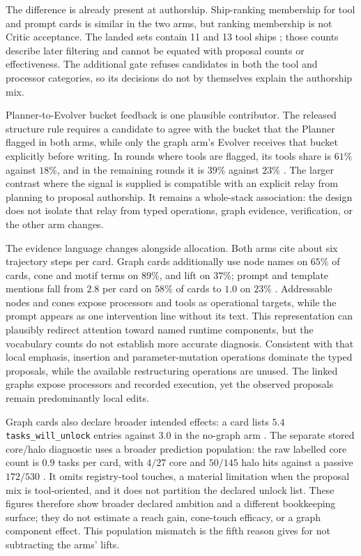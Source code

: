 The difference is already present at authorship. Ship-ranking membership for
tool and prompt cards is similar in the two arms, but ranking membership is
not Critic acceptance. The landed sets contain 11 and 13 tool ships ;
those counts describe later filtering and cannot be equated with proposal
counts or effectiveness. The additional gate refuses candidates in both the
tool and processor categories, so its decisions do not by themselves explain
the authorship mix.

Planner-to-Evolver bucket feedback is one plausible contributor. The
released structure rule requires a candidate to agree with the bucket that
the Planner flagged in both arms, while only the graph arm's Evolver receives
that bucket explicitly before writing. In rounds where tools are flagged, its tools share is
$61\%$ against $18\%$, and in the remaining rounds it is $39\%$ against
$23\%$ . The larger contrast where the signal is supplied is
compatible with an explicit relay from planning to proposal authorship. It
remains a whole-stack association: the design does not isolate that relay
from typed operations, graph evidence, verification, or the other arm
changes.

The evidence language changes alongside allocation. Both arms cite about six
trajectory steps per card. Graph cards additionally use node names on
$65\%$ of cards, cone and motif terms on $89\%$, and lift on $37\%$;
prompt and template mentions fall from $2.8$ per card on $58\%$ of cards to
$1.0$ on $23\%$ . Addressable nodes and cones expose processors and
tools as operational targets, while the prompt appears as one intervention
line without its text. This representation can plausibly redirect attention
toward named runtime components, but the vocabulary counts do not establish
more accurate diagnosis. Consistent with that local emphasis, insertion and
parameter-mutation operations dominate the typed proposals, while the
available restructuring operations are unused. The linked graphs expose processors and recorded execution, yet the
observed proposals remain predominantly local edits.

Graph cards also declare broader intended effects: a card lists $5.4$
\texttt{tasks\_will\_unlock} entries against $3.0$ in the no-graph arm
. The separate stored core/halo diagnostic uses a broader prediction
population: the raw labelled core count is $0.9$ tasks per card, with
$4/27$ core and $50/145$ halo hits against a passive $172/530$ .
It omits registry-tool touches, a material limitation when the proposal mix
is tool-oriented, and it does not partition the declared unlock list. These
figures therefore show broader declared ambition and a different bookkeeping
surface; they do not estimate a reach gain, cone-touch efficacy, or a graph
component effect. This population mismatch is the fifth reason  gives
for not subtracting the arms' lifts.

